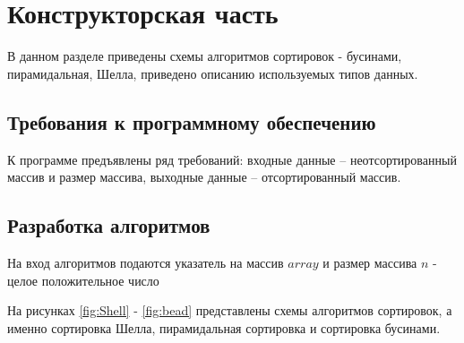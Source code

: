 \chapter{Конструкторская часть}

В данном разделе приведены схемы алгоритмов сортировок - бусинами, пирамидальная, Шелла, приведено описанию используемых типов данных.

\section{Требования к программному обеспечению}

К программе предъявлены ряд требований: входные данные -- неотсортированный массив и размер массива, выходные данные -- отсортированный массив.

\section{Разработка алгоритмов}

На вход алгоритмов подаются указатель на массив $array$ и размер массива $n$ - целое положительное число

На рисунках \ref{fig:Shell} - \ref{fig:bead} представлены схемы алгоритмов сортировок, а именно сортировка Шелла, пирамидальная сортировка и сортировка бусинами.

